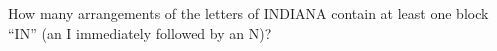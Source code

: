 How many arrangements of the letters of INDIANA contain at least one block ``IN'' (an I immediately followed by an N)?
